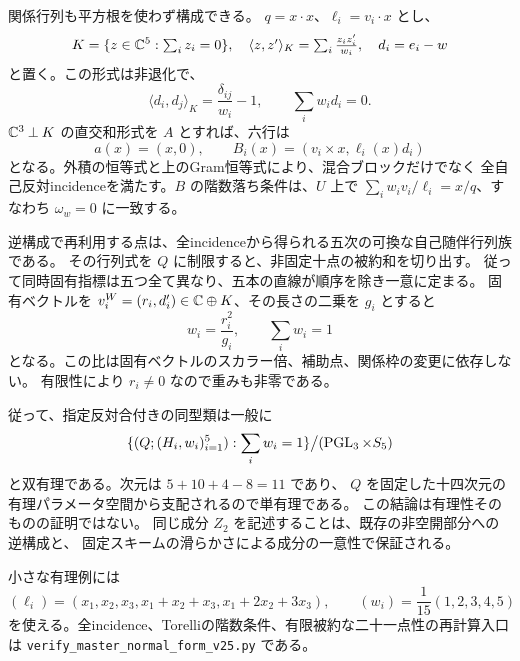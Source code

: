 関係行列も平方根を使わず構成できる。
$q=x\cdot x$、$\ell_i=v_i\cdot x$ とし、
\[
 K=\{z\in\mathbb C^5:\textstyle\sum_i z_i=0\},\quad
 \langle z,z'\rangle_K=\sum_i\frac{z_i z'_i}{w_i},\quad d_i=e_i-w
\]
と置く。この形式は非退化で、
\[
 \langle d_i,d_j\rangle_K=\frac{\delta_{ij}}{w_i}-1,
 \qquad \sum_iw_i d_i=0.
\]
$\mathbb C^3\mathbin\perp K$ の直交和形式を $A$ とすれば、六行は
\[
 a(x)=(x,0),\qquad B_i(x)=(v_i\times x,\ell_i(x)d_i)
\]
となる。外積の恒等式と上のGram恒等式により、混合ブロックだけでなく
全自己反対incidenceを満たす。$B$ の階数落ち条件は、$U$ 上で
$\sum_iw_i v_i/\ell_i=x/q$、すなわち $\omega_w=0$ に一致する。

逆構成で再利用する点は、全incidenceから得られる五次の可換な自己随伴行列族である。
その行列式を $Q$ に制限すると、非固定十点の被約和を切り出す。
従って同時固有指標は五つ全て異なり、五本の直線が順序を除き一意に定まる。
固有ベクトルを $v_i^W=(r_i,d'_i)\in\mathbb C\oplus K$、その長さの二乗を $g_i$ とすると
\[
 w_i=\frac{r_i^2}{g_i},\qquad \sum_iw_i=1
\]
となる。この比は固有ベクトルのスカラー倍、補助点、関係枠の変更に依存しない。
有限性により $r_i\ne0$ なので重みも非零である。

従って、指定反対合付きの同型類は一般に
\[
 \{(Q;(H_i,w_i)_{i=1}^5):\sum_iw_i=1\}
 \big/(\operatorname{PGL}_3\times S_5)
\]
と双有理である。次元は $5+10+4-8=11$ であり、
$Q$ を固定した十四次元の有理パラメータ空間から支配されるので単有理である。
この結論は有理性そのものの証明ではない。
同じ成分 $Z_2$ を記述することは、既存の非空開部分への逆構成と、
固定スキームの滑らかさによる成分の一意性で保証される\cite{PaperII}。

小さな有理例には
\[
 (\ell_i)=(x_1,x_2,x_3,x_1+x_2+x_3,x_1+2x_2+3x_3),
 \qquad (w_i)=\frac1{15}(1,2,3,4,5)
\]
を使える。全incidence、Torelliの階数条件、有限被約な二十一点性の再計算入口は
\nolinkurl{verify_master_normal_form_v25.py} である。

